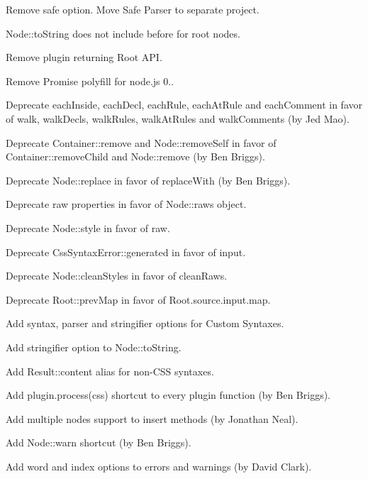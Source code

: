 \begin{DoxyItemize}
\item Remove {\ttfamily safe} option. Move Safe Parser to separate project.
\item {\ttfamily Node\+::to\+String} does not include {\ttfamily before} for root nodes.
\item Remove plugin returning {\ttfamily Root} A\+PI.
\item Remove Promise polyfill for node.\+js 0..
\item Deprecate {\ttfamily each\+Inside}, {\ttfamily each\+Decl}, {\ttfamily each\+Rule}, {\ttfamily each\+At\+Rule} and {\ttfamily each\+Comment} in favor of {\ttfamily walk}, {\ttfamily walk\+Decls}, {\ttfamily walk\+Rules}, {\ttfamily walk\+At\+Rules} and {\ttfamily walk\+Comments} (by Jed Mao).
\item Deprecate {\ttfamily Container\+::remove} and {\ttfamily Node\+::remove\+Self} in favor of {\ttfamily Container\+::remove\+Child} and {\ttfamily Node\+::remove} (by Ben Briggs).
\item Deprecate {\ttfamily Node\+::replace} in favor of {\ttfamily replace\+With} (by Ben Briggs).
\item Deprecate raw properties in favor of {\ttfamily Node\+::raws} object.
\item Deprecate {\ttfamily Node\+::style} in favor of {\ttfamily raw}.
\item Deprecate {\ttfamily Css\+Syntax\+Error\+::generated} in favor of {\ttfamily input}.
\item Deprecate {\ttfamily Node\+::clean\+Styles} in favor of {\ttfamily clean\+Raws}.
\item Deprecate {\ttfamily Root\+::prev\+Map} in favor of {\ttfamily Root.\+source.\+input.\+map}.
\item Add {\ttfamily syntax}, {\ttfamily parser} and {\ttfamily stringifier} options for Custom Syntaxes.
\item Add stringifier option to {\ttfamily Node\+::to\+String}.
\item Add {\ttfamily Result\+::content} alias for non-\/\+C\+SS syntaxes.
\item Add {\ttfamily plugin.\+process(css)} shortcut to every plugin function (by Ben Briggs).
\item Add multiple nodes support to insert methods (by Jonathan Neal).
\item Add {\ttfamily Node\+::warn} shortcut (by Ben Briggs).
\item Add {\ttfamily word} and {\ttfamily index} options to errors and warnings (by David Clark).

\end{DoxyItemize}
